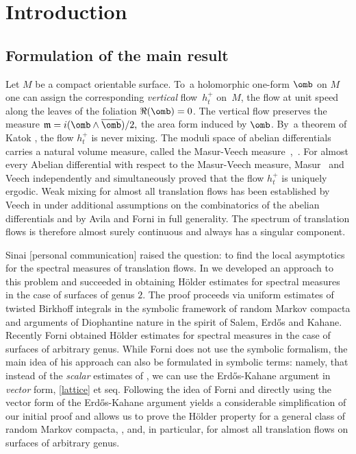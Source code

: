 \section{Introduction}
\subsection{Formulation of the main result}

Let $M$ be a compact orientable surface. To~a holomorphic one-form $\omb$ on $M$ one can assign the corresponding {\it vertical} flow~$h_t^+$ on~$M$, \ie the flow at unit speed along the
leaves of the foliation $\Re(\omb)=0$.
The vertical flow preserves the measure
$
\mathfrak{m}=i(\omb\wedge {\overline \omb})/2,
$
the area form induced by $\omb$.
By~a theorem of Katok \cite{katok}, the flow $h_t^+$ is never mixing.
The moduli space of abelian differentials carries a natural volume measure, called the Masur-Veech measure~\cite{masur},~\cite{veech}.
For almost every Abelian differential with respect to the Masur-Veech measure, \hbox{Masur}~\cite{masur} and Veech \cite{veech} independently and simultaneously proved that the flow $h_t^+$ is
uniquely ergodic. Weak mixing for almost all translation flows has been established by Veech in \cite{veechamj} under additional assumptions on the combinatorics of the abelian differentials and by Avila and Forni
\cite{AF} in full generality. The spectrum of translation flows is therefore almost surely continuous and always has a singular component.

Sinai [personal communication] raised the question: to find the local asymptotics for the spectral measures of translation flows.
In \cite{BuSo18a,BuSo19} we developed an approach to this problem and succeeded in obtaining Hölder estimates for spectral measures in the case of surfaces of genus $2$.
The proof proceeds via uniform estimates of twisted Birkhoff integrals
in the symbolic
framework of random Markov compacta and arguments of Diophantine nature in the spirit of Salem, Erd\H{o}s and Kahane.
Recently Forni \cite{Forni2} obtained Hölder estimates for spectral measures in the case of surfaces of arbitrary genus. While Forni does not use the symbolic formalism, the main idea of his approach can also be formulated in symbolic terms: namely, that instead of the {\it scalar} estimates of \cite{BuSo18a,BuSo19}, we can use the Erd\H{o}s-Kahane argument in {\it vector} form, \cf \eqref{lattice} et seq.
Following the idea of Forni and directly using the vector form of the Erd\H{o}s-Kahane argument yields a considerable simplification of our initial proof and allows us to prove the Hölder property for a general class of random Markov compacta, \cf \cite{Buf-umn}, and, in particular, for almost all translation flows on surfaces of arbitrary genus.

